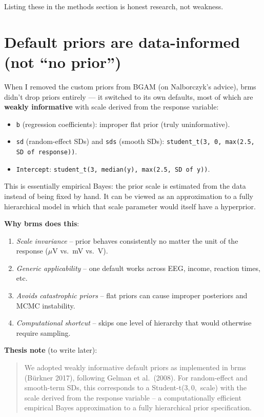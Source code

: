 \documentclass[11pt,a4paper]{article}
\begin{document}
\noindent Listing these in the methods section is honest research,
not weakness.

\section*{Default priors are data-informed (not ``no prior'')}

When I removed the custom priors from BGAM (on Nalborczyk's advice),
brms didn't drop priors entirely --- it switched to its own defaults,
most of which are \textbf{weakly informative} with scale derived from
the response variable:

\begin{itemize}\setlength{\itemsep}{0pt}
    \item \texttt{b} (regression coefficients): improper flat prior
          (truly uninformative).
    \item \texttt{sd} (random-effect SDs) and \texttt{sds} (smooth SDs):
          \texttt{student\_t(3, 0, max(2.5, SD of response))}.
    \item \texttt{Intercept}: \texttt{student\_t(3, median(y), max(2.5, SD of y))}.
\end{itemize}

This is essentially empirical Bayes: the prior scale is estimated
from the data instead of being fixed by hand. It can be viewed as an
approximation to a fully hierarchical model in which that scale
parameter would itself have a hyperprior.

\medskip
\noindent \textbf{Why brms does this}:
\begin{enumerate}\setlength{\itemsep}{0pt}
    \item \emph{Scale invariance} -- prior behaves consistently no
          matter the unit of the response ($\mu$V vs.\ mV vs.\ V).
    \item \emph{Generic applicability} -- one default works across
          EEG, income, reaction times, etc.
    \item \emph{Avoids catastrophic priors} -- flat priors can cause
          improper posteriors and MCMC instability.
    \item \emph{Computational shortcut} -- skips one level of
          hierarchy that would otherwise require sampling.
\end{enumerate}

\medskip
\noindent \textbf{Thesis note} (to write later):

\begin{quote}\small
We adopted weakly informative default priors as implemented in brms
(B\"urkner 2017), following Gelman et al.\ (2008). For random-effect
and smooth-term SDs, this corresponds to a Student-t($3, 0,$ scale)
with the scale derived from the response variable -- a computationally
efficient empirical Bayes approximation to a fully hierarchical prior
specification.
\end{quote}
\end{document}
